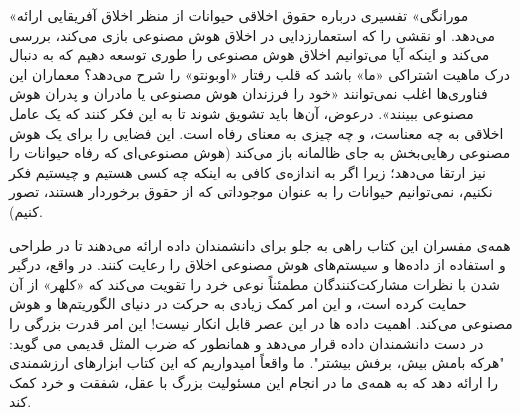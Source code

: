 «مورانگی» تفسیری درباره حقوق اخلاقی حیوانات از منظر اخلاق آفریقایی ارائه می‌دهد.
او نقشی را که استعمارزدایی در اخلاق هوش مصنوعی بازی می‌کند، بررسی می‌کند و اینکه آیا می‌توانیم اخلاق هوش مصنوعی را طوری توسعه دهیم که به دنبال درک ماهیت اشتراکی «ما» باشد که قلب رفتار «اوبونتو» را شرح می‌دهد؟ معماران این فناوری‌ها اغلب نمی‌توانند «خود را فرزندان هوش مصنوعی یا مادران و پدران هوش مصنوعی ببینند».
درعوض، آن‌ها باید تشویق شوند تا به این فکر کنند که یک عامل اخلاقی به چه معناست، و چه چیزی به معنای رفاه است.
این فضایی را برای یک هوش مصنوعی رهایی‌بخش به جای ظالمانه باز می‌کند (هوش مصنوعی‌ای که رفاه حیوانات را نیز ارتقا می‌دهد؛ زیرا اگر به اندازه‌ی کافی به اینکه چه کسی هستیم و چیستیم فکر نکنیم، نمی‌توانیم حیوانات را به عنوان موجوداتی که از حقوق برخوردار هستند، تصور کنیم).

همه‌ی مفسران این کتاب راهی به جلو برای دانشمندان داده ارائه می‌دهند تا در طراحی و استفاده از داده‌ها و سیستم‌های هوش مصنوعی اخلاق را رعایت کنند.
در واقع، درگیر شدن با نظرات مشارکت‌کنندگان مطمئناً نوعی خرد را تقویت می‌کند که «کلهر» از آن حمایت کرده است، و این امر کمک زیادی به حرکت در دنیای الگوریتم‌ها و هوش مصنوعی می‌کند.
اهمیت داده ها در این عصر قابل انکار نیست!
این امر قدرت بزرگی را در دست دانشمندان داده قرار می‌دهد و همانطور که ضرب المثل قدیمی می گوید: "هرکه بامش بیش، برفش بیشتر".
ما واقعاً امیدواریم که این کتاب ابزارهای ارزشمندی را ارائه دهد که به همه‌ی ما در انجام این مسئولیت بزرگ با عقل، شفقت و خرد کمک کند.